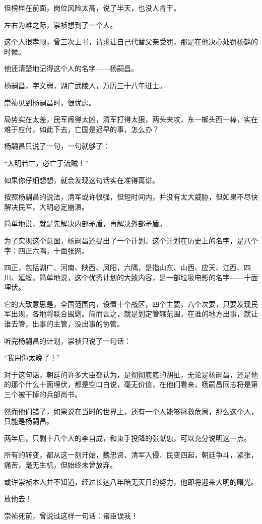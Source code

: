 \begin{multicols}{\theparacolNo}
但榜样在前面，岗位风险太高，说了半天，也没人肯干。

左右为难之际，崇祯想到了一个人。

这个人很孝顺，曾三次上书，请求让自己代替父亲受罚，那是在他决心处罚杨鹤的时候。

他还清楚地记得这个人的名字——杨嗣昌。

杨嗣昌，字文弱，湖广武陵人，万历三十八年进士。

崇祯见到杨嗣昌时，很忧虑。

局势实在太差，民军闹得太凶，清军打得太狠，两头夹攻，东一榔头西一棒，实在难于应付，如此下去，亡国是迟早的事，怎么办？

杨嗣昌只说了一句，一句就够了：

“大明若亡，必亡于流贼！”

如果你仔细想想，就会发现这句话实在准得离谱。

按照杨嗣昌的说法，清军或许很强，但短时间内，并没有太大威胁，但如果不尽快解决民军，大明必定崩溃。

简单地说，就是先解决内部矛盾，再解决外部矛盾。

为了实现这个意图，杨嗣昌还提出了一个计划，这个计划在历史上的名字，是八个字：四正六隅，十面张网。

四正，包括湖广、河南、陕西、凤阳，六隅，是指山东、山西、应天、江西、四川、延绥。简单地说，这个优秀计划的大致内容，是一部垃圾电影的名字——十面埋伏。

它的大致意思是，全国范围内，设置十个战区，四个主要，六个次要，只要发现民军出现，各地将联合围剿。简而言之，就是划定管辖范围，在谁的地方出事，就让谁去管，出事的主管，没出事的协管。

听完杨嗣昌的计划，崇祯只说了一句话：

“我用你太晚了！”

对于这句话，朝廷的许多大臣都认为，是彻彻底底的胡扯，无论是杨嗣昌，还是他的那个什么十面埋伏，都是空口白说，毫无价值，在他们看来，杨嗣昌同志将是第三个被干掉的兵部尚书。

然而他们错了，如果说在当时的世界上，还有一个人能够拯救危局，那么这个人，只能是杨嗣昌。

两年后，只剩十八个人的李自成，和束手投降的张献忠，可以充分说明这一点。

所有的转变，都从这一刻开始，魏忠贤、清军入侵、民变四起，朝廷争斗，紧张，痛苦，毫无生机，但始终未曾放弃。

或许崇祯本人并不知道，经过长达八年暗无天日的努力，他即将迎来大明的曙光。

放他去！

崇祯死前，曾说过这样一句话：诸臣误我！


\end{multicols}
